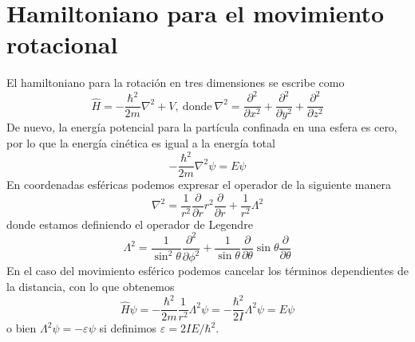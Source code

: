 \section{Hamiltoniano para el movimiento rotacional}
El hamiltoniano para la rotación en tres
dimensiones se escribe como
\begin{equation}
    \hat{H}=-\frac{\hbar^2}{2m}\nabla^2 +V,
    \mathrm{~ donde~}
    \nabla^2=\frac{\partial^2}{\partial x^2} + \frac{\partial^2}{\partial y^2} +\frac{\partial^2}{\partial z^2}
\end{equation}
De nuevo, la energía potencial para la partícula confinada
en una esfera es cero, por lo que la energía cinética es
igual a la energía total
\begin{equation}
    -\frac{\hbar^2}{2m}\nabla^2\psi=E\psi
\end{equation}
En coordenadas esféricas podemos expresar el operador
de la siguiente manera
\begin{equation}
    \nabla^2=\frac{1}{r^2}\frac{\partial}{\partial r}r^2\frac{\partial}{\partial r} + \frac{1}{r^2}\Lambda^2
\end{equation}
donde estamos definiendo el operador de Legendre
\begin{equation}
    \Lambda^2=\frac{1}{\sin^2\theta}\frac{\partial^2}{\partial\phi^2}+
    \frac{1}{\sin\theta}\frac{\partial}{\partial\theta}\sin\theta\frac{\partial}{\partial\theta}
\end{equation}
En el caso del movimiento esférico podemos cancelar los 
términos dependientes de la distancia, con lo que obtenemos
\begin{equation}
\hat{H}\psi=-\frac{\hbar^2}{2m}\frac{1}{r^2}\Lambda^2\psi=-\frac{\hbar^2}{2I}\Lambda^2\psi=E\psi
\label{eq:rothamiltonian}
\end{equation}
o bien $\Lambda^2\psi=-\varepsilon\psi$ si definimos 
$\varepsilon=2IE/\hbar^2$.


